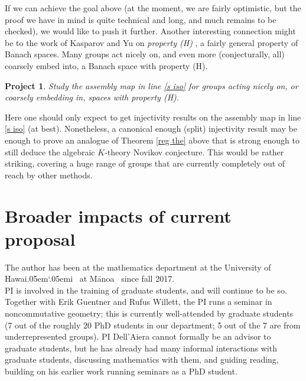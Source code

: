 \documentclass[11pt]{article}
\newcommand{\Manoa}{M\=anoa}
\newcommand{\Hawaii}{Hawai\kern.05em`\kern.05em\relax i}
\theoremstyle{plain}
\newtheorem{project}[theorem]{Project}
\theoremstyle{definition}
\theoremstyle{remark}
\begin{document}
If we can achieve the goal above (at the moment, we are fairly optimistic, but the proof we have in mind is quite technical and long, and much remains to be checked), we would like to push it further.  Another interesting connection might be to the work of Kasparov and Yu on \emph{property (H)} \cite{Kasparov:2009jt}, a fairly general property of Banach spaces.  Many groups act nicely on, and even more (conjecturally, all) coarsely embed into, a Banach space with property (H).

\begin{project}
Study the assembly map in line \eqref{s iso} for groups acting nicely on, or coarsely embedding in, spaces with property (H).
\end{project}

Here one should only expect to get injectivity results on the assembly map in line \eqref{s iso} (at best).  Nonetheless, a canonical enough (split) injectivity result may be enough to prove an analogue of Theorem \ref{reg the} above that is strong enough to still deduce the algebraic $K$-theory Novikov conjecture.  This would be rather striking, covering a huge range of groups that are currently completely out of reach by other methods.











 
 
 \section{Broader impacts of current proposal}
  
The author has been at the mathematics department at the University of \Hawaii~ at \Manoa~ since fall 2017.\\  

PI is involved in the training of graduate students, and will continue to be so. Together with Erik Guentner and Rufus Willett, the PI runs a seminar in noncommutative geometry; this is currently well-attended by graduate students (7 out of the roughly 20 PhD students in our department; 5 out of the 7 are from underrepresented groups). PI Dell'Aiera cannot formally be an advisor to graduate students, but he has already had many informal interactions with graduate students, discussing mathematics with them, and guiding reading, building on his earlier work running seminars as a PhD student.\\
\end{document}
